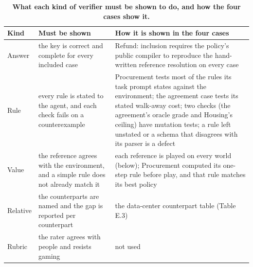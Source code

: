 \renewcommand{\thetable}{F.2}
\begin{longtable}[]{@{}
  >{\raggedright\arraybackslash}p{}
  >{\raggedright\arraybackslash}p{}
  >{\raggedright\arraybackslash}p{}@{}}
\caption{\textbf{What each kind of verifier must be shown to do, and how the four cases show it.}}\label{tab:F.2}\tabularnewline
\toprule\noalign{}
\begin{minipage}[b]{\linewidth}\raggedright
Kind
\end{minipage} & \begin{minipage}[b]{\linewidth}\raggedright
Must be shown
\end{minipage} & \begin{minipage}[b]{\linewidth}\raggedright
How it is shown in the four cases
\end{minipage} \\
\midrule\noalign{}
\endhead
\bottomrule\noalign{}
\endlastfoot
Answer & the key is correct and complete for every included case & Refund: inclusion requires the policy's public compiler to reproduce the hand-written reference resolution on every case \\
Rule & every rule is stated to the agent, and each check fails on a counterexample & Procurement tests most of the rules its task prompt states against the environment; the agreement case tests its stated walk-away cost; two checks (the agreement's oracle grade and Housing's ceiling) have mutation tests; a rule left unstated or a schema that disagrees with its parser is a defect \\
Value & the reference agrees with the environment, and a simple rule does not already match it & each reference is played on every world (below); Procurement computed its one-step rule before play, and that rule matches its best policy \\
Relative & the counterparts are named and the gap is reported per counterpart & the data-center counterpart table (Table E.3) \\
Rubric & the rater agrees with people and resists gaming & not used \\
\end{longtable}

